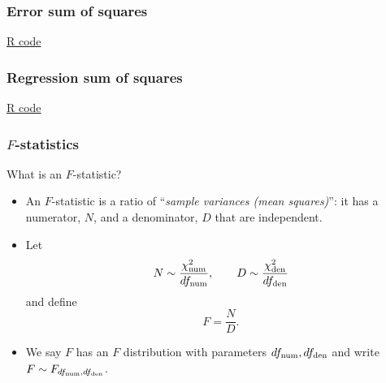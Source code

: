 \documentclass[handout]{beamer}
\begin{document}
   \begin{frame}
   \frametitle{Error sum of squares}
   \begin{center}
   \end{center}
   \href{http://stats191.stanford.edu/simple_diagnostics.html#goodness-of-fit-sums-of-squares}{R code}
   \end{frame}



   \begin{frame}
   \frametitle{Regression sum of squares}
   \begin{center}
   \end{center}
   \href{http://stats191.stanford.edu/simple_diagnostics.html#goodness-of-fit-sums-of-squares}{R code}
   \end{frame}


   \begin{frame} \frametitle{$F$-statistics}

   \begin{block}
   {What is an $F$-statistic?}

   \begin{itemize}


   \item An $F$-statistic is a ratio of ``{\em sample variances (mean squares)}'': it has a numerator, $N$,  and a denominator, $D$ that are independent.


   \item Let $$N \sim \frac{\chi^2_{\rm num} }{ df_{{\rm num}}}, \qquad D \sim \frac{\chi^2_{\rm den} }{ df_{{\rm den}}}
   $$
   and define
   $$F = \frac{N}{D}.$$

   \item We say $F$ has an $F$ distribution with parameters $df_{{\rm num}}, df_{{\rm den}}$ and write $F \sim F_{df_{{\rm num}}, df_{{\rm den}}}$.
   \end{itemize}

   \end{block}
   \end{frame}
\end{document}
